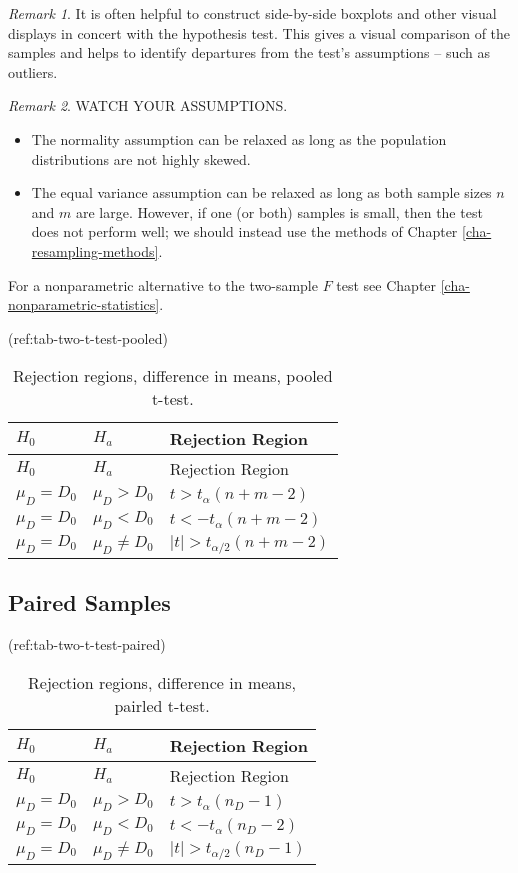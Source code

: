 \documentclass[]{book}
\providecommand{\tightlist}{%
  \setlength{\itemsep}{0pt}\setlength{\parskip}{0pt}}
\numberwithin{equation}{chapter}
\numberwithin{figure}{chapter}
\theoremstyle{plain}
\theoremstyle{definition}
\theoremstyle{remark}
\theoremstyle{definition}
\theoremstyle{definition}
\theoremstyle{remark}
\newtheorem*{remark}{Remark}
\begin{document}
\bigskip

\begin{remark}
It is often helpful to construct side-by-side boxplots and other visual
displays in concert with the hypothesis test. This gives a visual
comparison of the samples and helps to identify departures from the
test's assumptions -- such as outliers.
\end{remark}

\bigskip

\begin{remark}
WATCH YOUR ASSUMPTIONS.

\begin{itemize}
\tightlist
\item
  The normality assumption can be relaxed as long as the population
  distributions are not highly skewed.
\item
  The equal variance assumption can be relaxed as long as both sample
  sizes \(n\) and \(m\) are large. However, if one (or both) samples is
  small, then the test does not perform well; we should instead use the
  methods of Chapter \ref{cha-resampling-methods}.
\end{itemize}
\end{remark}

For a nonparametric alternative to the two-sample \(F\) test see Chapter
\ref{cha-nonparametric-statistics}.

(ref:tab-two-t-test-pooled)

\begin{longtable}[]{@{}lll@{}}
\caption{Rejection regions, difference in means, pooled
t-test.}\tabularnewline
\toprule
\(H_{0}\) & \(H_{a}\) & Rejection Region\tabularnewline
\midrule
\endfirsthead
\toprule
\(H_{0}\) & \(H_{a}\) & Rejection Region\tabularnewline
\midrule
\endhead
\(\mu_{D} = D_{0}\) & \(\mu_{D} > D_{0}\) &
\(t > t_{\alpha}(n + m - 2)\)\tabularnewline
\(\mu_{D} = D_{0}\) & \(\mu_{D} < D_{0}\) &
\(t < -t_{\alpha}(n + m - 2)\)\tabularnewline
\(\mu_{D} = D_{0}\) & \(\mu_{D} \neq D_{0}\) &
\(\vert t \vert > t_{\alpha/2}(n + m - 2)\)\tabularnewline
\bottomrule
\end{longtable}

\subsection{Paired Samples}\label{paired-samples}

(ref:tab-two-t-test-paired)

\begin{longtable}[]{@{}lll@{}}
\caption{Rejection regions, difference in means, pairled
t-test.}\tabularnewline
\toprule
\(H_{0}\) & \(H_{a}\) & Rejection Region\tabularnewline
\midrule
\endfirsthead
\toprule
\(H_{0}\) & \(H_{a}\) & Rejection Region\tabularnewline
\midrule
\endhead
\(\mu_{D} = D_{0}\) & \(\mu_{D} > D_{0}\) &
\(t > t_{\alpha}(n_{D} - 1)\)\tabularnewline
\(\mu_{D} = D_{0}\) & \(\mu_{D} < D_{0}\) &
\(t < -t_{\alpha}(n_{D} - 2)\)\tabularnewline
\(\mu_{D} = D_{0}\) & \(\mu_{D} \neq D_{0}\) &
\(\vert t \vert > t_{\alpha/2}(n_{D} - 1)\)\tabularnewline
\bottomrule
\end{longtable}
\end{document}
